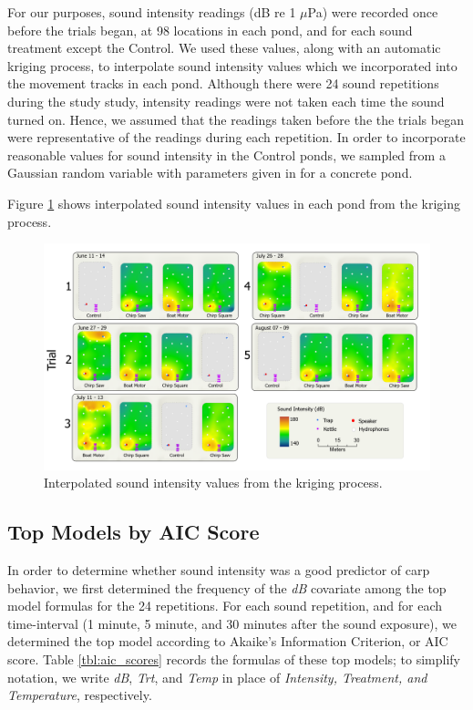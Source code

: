 \documentclass[12pt]{article}
\begin{document}
	For our purposes, sound intensity readings (dB re 1 $\mu$Pa) were recorded once before the trials began, at 98 locations in each pond, and for each sound treatment except the Control. We used these values, along with an automatic kriging process, to interpolate sound intensity values which we incorporated into the movement tracks in each pond. Although there were 24 sound repetitions during the study study, intensity readings were not taken each time the sound turned on. Hence, we assumed that the readings taken before the the trials began were representative of the readings during each repetition. In order to incorporate reasonable values for sound intensity in the Control ponds, we sampled from a Gaussian random variable with parameters given in \cite{Wysocki2007} for a concrete pond.
	
	Figure \ref{img:intensities} shows interpolated sound intensity values in each pond from the kriging process.
	
	\begin{figure}[H]
		\includegraphics[width=\textwidth]{intensities.png}
		\caption{Interpolated sound intensity values from the kriging process.}
		\label{img:intensities}
	\end{figure}		
	
	\subsection{Top Models by AIC Score}
	
	In order to determine whether sound intensity was a good predictor of carp behavior, we first determined the frequency of the \emph{dB} covariate among the top model formulas for the 24 repetitions. For each sound repetition, and for each time-interval (1 minute, 5 minute, and 30 minutes after the sound exposure), we determined the top model according to Akaike's Information Criterion, or AIC score. Table \ref{tbl:aic_scores} records the formulas of these top models; to simplify notation, we write \emph{dB}, \emph{Trt}, and \emph{Temp} in place of \emph{Intensity, Treatment, and Temperature}, respectively.
	
\end{document}
